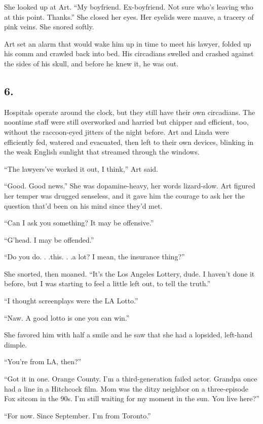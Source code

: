 She looked up at Art. “My boyfriend. Ex-boyfriend. Not sure who’s
leaving who at this point. Thanks.” She closed her eyes. Her
eyelids were mauve, a tracery of pink veins. She snored softly.

Art set an alarm that would wake him up in time to meet his lawyer,
folded up his comm and crawled back into bed. His circadians
swelled and crashed against the sides of his skull, and before he
knew it, he was out.

\subsection{6.}

Hospitals operate around the clock, but they still have their own
circadians. The noontime staff were still overworked and harried
but chipper and efficient, too, without the raccoon-eyed jitters of
the night before. Art and Linda were efficiently fed, watered and
evacuated, then left to their own devices, blinking in the weak
English sunlight that streamed through the windows.

“The lawyers’ve worked it out, I think,” Art said.

“Good. Good news.” She was dopamine-heavy, her words liz\-ard-slow.
Art figured her temper was drugged senseless, and it gave him the
courage to ask her the question that’d been on his mind since
they’d met.

“Can I ask you something? It may be offensive.”

“G’head. I may be offended.”

“Do you do. . .this. . .a lot? I mean, the insurance thing?”

She snorted, then moaned. “It’s the Los Angeles Lottery, dude. I
haven’t done it before, but I was starting to feel a little left
out, to tell the truth.”

“I thought screenplays were the LA Lotto.”

“Naw. A good lotto is one you can win.”

She favored him with half a smile and he saw that she had a
lopsided, left-hand dimple.

“You’re from LA, then?”

“Got it in one. Orange County. I’m a third-generation failed actor.
Grandpa once had a line in a Hitchcock film. Mom was the ditzy
neighbor on a three-episode Fox sitcom in the 90s. I’m still
waiting for my moment in the sun. You live here?”

“For now. Since September. I’m from Toronto.”

